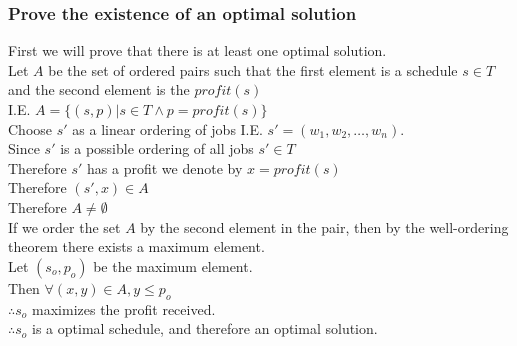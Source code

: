 \documentclass{article}
\begin{document}
      \subsubsection{Prove the existence of an optimal solution}
        First we will prove that there is at least one optimal solution. \\
        Let $A$ be the set of ordered pairs such that the first element is a schedule $s \in T$ and the second element is the $profit(s)$ \\
        I.E. $A = \{ (s, p) | s \in T \land p = profit(s)\}$ \\
        Choose $s'$ as a linear ordering of jobs I.E. $s' = (w_{1}, w_{2}, \ldots, w_{n})$. \\
        Since $s'$ is a possible ordering of all jobs $s' \in T$ \\
        Therefore $s'$ has a profit we denote by $x = profit(s)$ \\
        Therefore $(s', x) \in A$ \\
        Therefore $A \neq \emptyset$ \\
        If we order the set $A$ by the second element in the pair, then by the well-ordering theorem there exists a maximum element. \\
        Let $(s_{o}, p_{o})$ be the maximum element. \\
        Then $\forall(x,y) \in A, y \leq p_{o}$ \\
        $\therefore s_{o}$ maximizes the profit received. \\
        $\therefore s_{o}$ is a optimal schedule, and therefore an optimal solution. \\
\end{document}

